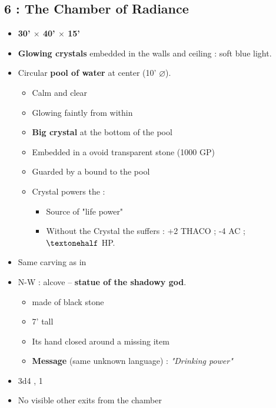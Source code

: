\subsection{6 : The Chamber of Radiance}\label{l1:r6}
\begin{itemize}
    \item \textbf{30' $\times$ 40' $\times$ 15'}
    \item \textbf{Glowing crystals} embedded in the walls and ceiling : soft blue light.
    \item Circular \textbf{pool of water} at center (10' $\diameter$).
    \begin{itemize}
        \item Calm and clear
        \item Glowing faintly from within
        \item \textbf{Big crystal} at the bottom of the pool
        \item Embedded in a ovoid transparent stone (1000 GP)
        \item Guarded by a \textbf{} bound to the pool
        \item Crystal powers the \textbf{}:
        \begin{itemize}
            \item Source of "life power"
            \item Without the Crystal the \textbf{} suffers :
            +2 THACO ; -4 AC ; $\textonehalf$ HP.
        \end{itemize}
    \end{itemize}
    \item Same carving as in \textbf{}
    \item N-W : alcove -- \textbf{statue of the shadowy god}.
    \begin{itemize}
        \item made of black stone
        \item 7' tall
        \item Its hand closed around a missing item
        \item \textbf{Message} (same unknown language) : \emph{"Drinking power"}
    \end{itemize}
    \item 3d4 \textbf{}, 1 \textbf{}
    \item No visible other exits from the chamber
\end{itemize}

